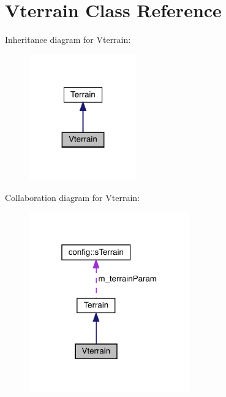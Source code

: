 \hypertarget{class_vterrain}{}\section{Vterrain Class Reference}
\label{class_vterrain}


Inheritance diagram for Vterrain\+:\nopagebreak
\begin{figure}[H]
\begin{center}
\leavevmode
\includegraphics[width=131pt]{class_vterrain__inherit__graph}
\end{center}
\end{figure}


Collaboration diagram for Vterrain\+:\nopagebreak
\begin{figure}[H]
\begin{center}
\leavevmode
\includegraphics[width=196pt]{class_vterrain__coll__graph}
\end{center}
\end{figure}
